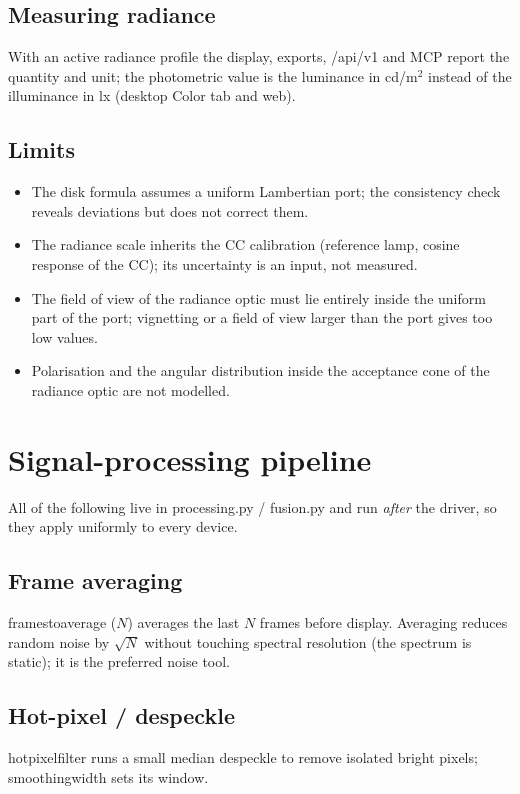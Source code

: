 \documentclass[12pt,a4paper]{article}
\DeclareRobustCommand{\code}[1]{{\ttfamily\small\def\_{\rawus\allowbreak}#1}}
\DeclareRobustCommand{\file}[1]{{\ttfamily\small\def\_{\rawus\allowbreak}#1}}
\DeclareRobustCommand{\key}[1]{{\ttfamily\small\color{acc2}\def\_{\rawus\allowbreak}#1}}
\begin{document}
\subsection{Measuring radiance}
With an active radiance profile the display, exports, \code{/api/v1} and MCP
report the quantity and unit; the photometric value is the luminance in cd/m$^2$
instead of the illuminance in lx (desktop Color tab and web).

\subsection{Limits}
\begin{itemize}
  \item The disk formula assumes a uniform Lambertian port; the consistency
        check reveals deviations but does not correct them.
  \item The radiance scale inherits the CC calibration (reference lamp,
        cosine response of the CC); its uncertainty is an input, not measured.
  \item The field of view of the radiance optic must lie entirely inside the
        uniform part of the port; vignetting or a field of view larger than the
        port gives too low values.
  \item Polarisation and the angular distribution inside the acceptance cone
        of the radiance optic are not modelled.
\end{itemize}

\section{Signal-processing pipeline}\label{sec:pipeline}
All of the following live in \file{processing.py} / \file{fusion.py} and run
\emph{after} the driver, so they apply uniformly to every device.

\subsection{Frame averaging}
\key{frames\_to\_average} ($N$) averages the last $N$ frames before display.
Averaging reduces random noise by $\sqrt{N}$ without touching spectral resolution
(the spectrum is static); it is the preferred noise tool.

\subsection{Hot-pixel / despeckle}
\key{hot\_pixel\_filter} runs a small median despeckle to remove isolated bright
pixels; \key{smoothing\_width} sets its window.
\end{document}
